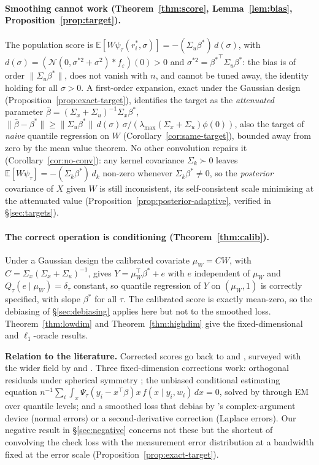 \documentclass[12pt,a4paper]{article}
\theoremstyle{definition}
\theoremstyle{remark}
\newcommand{\E}{\mathbb{E}}
\newcommand{\cN}{\mathcal{N}}
\newcommand{\psit}{\psi_\tau}
\newcommand{\betas}{\beta^*}
\newcommand{\bbar}{\bar{\beta}}
\newcommand{\muv}{\mu_W}
\newcommand{\Ccal}{C}
\begin{document}
\paragraph{Smoothing cannot work (Theorem~\ref{thm:score}, Lemma~\ref{lem:bias},
Proposition~\ref{prop:target}).} The population score is
$\E[W\psit(r_i^*,\sigma)]=-(\Sigma_u\betas)\,d(\sigma)$, with
$d(\sigma)=(\cN(0,\sigma^{*2}+\sigma^2)*f_\varepsilon)(0)>0$ and
$\sigma^{*2}={\betas}^\top\Sigma_u\betas$: the bias is of order $\|\Sigma_u\betas\|$, does not
vanish with $n$, and cannot be tuned away, the identity holding for all $\sigma>0$. A
first-order expansion, exact under the Gaussian design
(Proposition~\ref{prop:exact-target}), identifies the target as the \emph{attenuated}
parameter $\bbar=(\Sigma_x+\Sigma_u)^{-1}\Sigma_x\betas$,
$\|\bbar-\betas\|\ge\|\Sigma_u\betas\|\,d(\sigma)\,\sigma/(\lambda_{\max}(\Sigma_x+\Sigma_u)\phi(0))$,
also the target of \emph{naive} quantile regression on $W$
(Corollary~\ref{cor:same-target}), bounded away from zero by the mean value theorem. No
other convolution repairs it (Corollary~\ref{cor:no-conv}): any kernel covariance
$\Sigma_k\succ0$ leaves $\E[W\psit]=-(\Sigma_k\betas)\,d_k$ non-zero whenever
$\Sigma_k\betas\neq0$, so the \emph{posterior} covariance of $X$ given $W$ is still
inconsistent, its self-consistent scale minimising at the attenuated value
(Proposition~\ref{prop:posterior-adaptive}, verified in \S\ref{sec:targets}).

\paragraph{The correct operation is conditioning (Theorem~\ref{thm:calib}).} Under a Gaussian
design the calibrated covariate $\muv=\Ccal W$, with
$\Ccal=\Sigma_x(\Sigma_x+\Sigma_u)^{-1}$, gives $Y=\muv^\top\betas+e$ with $e$ independent of
$\muv$ and $Q_\tau(e\mid\muv)=\delta_\tau$ constant, so quantile regression of $Y$ on
$(\muv,1)$ is correctly specified, with slope $\betas$ for all $\tau$. The calibrated score
is exactly mean-zero, so the debiasing of \S\ref{sec:debiasing} applies here but not to the
smoothed loss. Theorem~\ref{thm:lowdim} and Theorem~\ref{thm:highdim}
give the fixed-dimensional and $\ell_1$-oracle results.

\medskip
\noindent\textbf{Relation to the literature.}
Corrected scores go back to \citet{stefanski1989} and \citet{nakamura1990}, surveyed with the
wider field by \citet{fuller1987} and \citet{carroll2006measurement}. Three fixed-dimension
corrections work: orthogonal residuals under spherical symmetry \citep{he2000quantile}; the
unbiased conditional estimating equation
$n^{-1}\sum_i\int_x \Psi_\tau(y_i-x^\top\beta)x\,f(x\mid y_i,w_i)\,dx=0$, solved by
\citet{wei2009quantile} through EM over quantile levels; and a smoothed loss that
\citet{wang2012correctedloss} debias by \citet{stefanski1989}'s complex-argument device
(normal errors) or a second-derivative correction (Laplace errors). Our negative result in
\S\ref{sec:negative} concerns not these but the shortcut of convolving the check loss with the
measurement error distribution at a bandwidth fixed at the error scale
(Proposition~\ref{prop:exact-target}).
\end{document}
